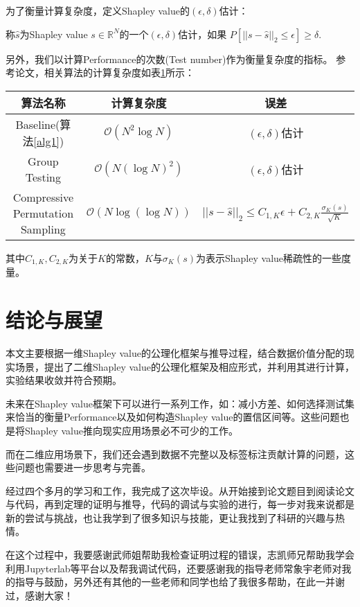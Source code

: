 为了衡量计算复杂度，定义Shapley value的$(\epsilon, \delta)$估计：
\begin{definition}
	称$\hat{s}$为Shapley value $s \in \mathbb{R}^N$的一个$(\epsilon, \delta)$估计，如果
	$P[||s-\hat{s}||_2\leq \epsilon]\geq \delta$.
\end{definition}
另外，我们以计算Performance的次数(Test number)作为衡量复杂度的指标。
参考论文\cite{jia2019towards}，相关算法的计算复杂度如表\ref{table alg}所示：
\begin{table}[H]\small
	\centering
	\label{table alg}
	\begin{tabular}{ccc}
		\toprule[1.5pt]
		\textbf{算法名称} & \textbf{计算复杂度} & \textbf{误差} \\
		\midrule[1pt]
		Baseline(算法\ref{alg1})& $\mathcal{O}(N^2\log N)$ & $(\epsilon, \delta)$估计  \\
		Group Testing & $\mathcal{O}(N(\log N)^2)$ & $(\epsilon, \delta)$估计  \\
		Compressive Permutation Sampling&$\mathcal{O}(N\log(\log N))$ & $||s-\hat{s}||_2\leq C_{1,K}\epsilon+C_{2,K}\frac{\sigma_K(s)}{\sqrt{K}}$ \\
		\bottomrule[1.5pt]
	\end{tabular}
	
\end{table}
其中$C_{1,K}, C_{2,K}$为关于$K$的常数，$K$与$\sigma_K(s)$为表示Shapley value稀疏性的一些度量。
\






\section{结论与展望}
本文主要根据一维Shapley value的公理化框架与推导过程，结合数据价值分配的现实场景，提出了二维Shapley value的公理化框架及相应形式，并利用其进行计算，实验结果收敛并符合预期。

未来在Shapley value框架下可以进行一系列工作，如：减小方差、如何选择测试集来恰当的衡量Performance以及如何构造Shapley value的置信区间等。这些问题也是将Shapley value推向现实应用场景必不可少的工作。

而在二维应用场景下，我们还会遇到数据不完整以及标签标注贡献计算的问题，这些问题也需要进一步思考与完善。
\backmatter 



\appendixs{}%


\begin{acknowledgment}%
经过四个多月的学习和工作，我完成了这次毕设。从开始接到论文题目到阅读论文与代码，再到定理的证明与推导，代码的调试与实验的进行，每一步对我来说都是新的尝试与挑战，也让我学到了很多知识与技能，更让我找到了科研的兴趣与热情。

在这个过程中，我要感谢武师姐帮助我检查证明过程的错误，志凯师兄帮助我学会利用Jupyterlab等平台以及帮我调试代码，还要感谢我的指导老师常象宇老师对我的指导与鼓励，另外还有其他的一些老师和同学也给了我很多帮助，在此一并谢过，感谢大家！


\end{acknowledgment}


  